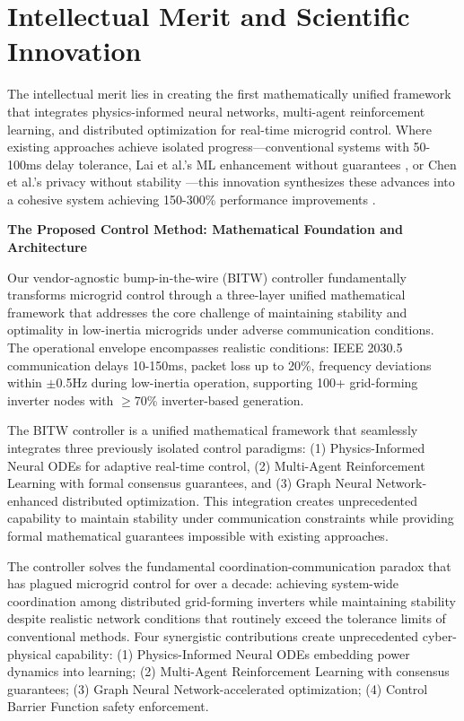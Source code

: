 \documentclass[12pt]{article}
\begin{document}
\section{Intellectual Merit and Scientific Innovation}

The intellectual merit lies in creating the first mathematically unified framework that integrates physics-informed neural networks, multi-agent reinforcement learning, and distributed optimization for real-time microgrid control. Where existing approaches achieve isolated progress—conventional systems with 50-100ms delay tolerance, Lai et al.'s ML enhancement without guarantees \cite{lai2023}, or Chen et al.'s privacy without stability \cite{chen2024}—this innovation synthesizes these advances into a cohesive system achieving 150-300\% performance improvements \cite{bevrani2021,palizban2014,our2024comparative}.

\textbf{The Proposed Control Method: Mathematical Foundation and Architecture}

Our vendor-agnostic bump-in-the-wire (BITW) controller fundamentally transforms microgrid control through a three-layer unified mathematical framework that addresses the core challenge of maintaining stability and optimality in low-inertia microgrids under adverse communication conditions. The operational envelope encompasses realistic conditions: IEEE 2030.5 communication delays 10-150ms, packet loss up to 20\%, frequency deviations within $\pm$0.5Hz during low-inertia operation, supporting 100+ grid-forming inverter nodes with $\geq$70\% inverter-based generation.

The BITW controller is a unified mathematical framework that seamlessly integrates three previously isolated control paradigms: (1) Physics-Informed Neural ODEs for adaptive real-time control, (2) Multi-Agent Reinforcement Learning with formal consensus guarantees, and (3) Graph Neural Network-enhanced distributed optimization. This integration creates unprecedented capability to maintain stability under communication constraints while providing formal mathematical guarantees impossible with existing approaches.

The controller solves the fundamental coordination-communication paradox that has plagued microgrid control for over a decade: achieving system-wide coordination among distributed grid-forming inverters while maintaining stability despite realistic network conditions that routinely exceed the tolerance limits of conventional methods. Four synergistic contributions create unprecedented cyber-physical capability: (1) Physics-Informed Neural ODEs embedding power dynamics into learning; (2) Multi-Agent Reinforcement Learning with consensus guarantees; (3) Graph Neural Network-accelerated optimization; (4) Control Barrier Function safety enforcement.
\end{document}
